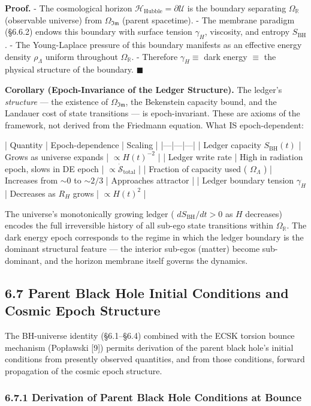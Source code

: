 \documentclass[11pt,a4paper]{article}
\theoremstyle{definition}
\theoremstyle{remark}
\begin{document}
\textbf{Proof.}
- The cosmological horizon $\mathcal{H}_{\text{Hubble}} = \partial\mathcal{U}$ is the boundary separating $\Omega_{\mathbb{R}}$ (observable universe) from $\Omega_{\mathfrak{Im}}$ (parent spacetime).
- The membrane paradigm (\S 6.6.2) endows this boundary with surface tension $\gamma_H$, viscosity, and entropy $S_{\text{BH}}$.
- The Young-Laplace pressure of this boundary manifests as an effective energy density $\rho_\Lambda$ uniform throughout $\Omega_{\mathbb{R}}$.
- Therefore $\gamma_H \equiv$ dark energy $\equiv$ the physical structure of the boundary. $\blacksquare$

\textbf{Corollary (Epoch-Invariance of the Ledger Structure).} The ledger's \textit{structure} — the existence of $\Omega_{\mathfrak{Im}}$, the Bekenstein capacity bound, and the Landauer cost of state transitions — is epoch-invariant. These are axioms of the framework, not derived from the Friedmann equation. What IS epoch-dependent:

| Quantity | Epoch-dependence | Scaling |
|---|---|---|
| Ledger capacity $S_{\text{BH}}(t)$ | Grows as universe expands | $\propto H(t)^{-2}$ |
| Ledger write rate | High in radiation epoch, slows in DE epoch | $\propto \dot{\mathcal{S}}_{\text{total}}$ |
| Fraction of capacity used ( $\Omega_\Lambda$ ) | Increases from $\sim 0$ to $\sim 2/3$ | Approaches attractor |
| Ledger boundary tension $\gamma_H$ | Decreases as $R_H$ grows | $\propto H(t)^2$ |

The universe's monotonically growing ledger ( $dS_{\text{BH}}/dt > 0$ as $H$ decreases) encodes the full irreversible history of all sub-ego state transitions within $\Omega_{\mathbb{R}}$. The dark energy epoch corresponds to the regime in which the ledger boundary is the dominant structural feature — the interior sub-egos (matter) become sub-dominant, and the horizon membrane itself governs the dynamics.

\subsection{6.7 Parent Black Hole Initial Conditions and Cosmic Epoch Structure}

The BH-universe identity (\S 6.1–\S 6.4) combined with the ECSK torsion bounce mechanism (Popławski [9]) permits derivation of the parent black hole's initial conditions from presently observed quantities, and from those conditions, forward propagation of the cosmic epoch structure.

\subsubsection{6.7.1 Derivation of Parent Black Hole Conditions at Bounce}
\end{document}
